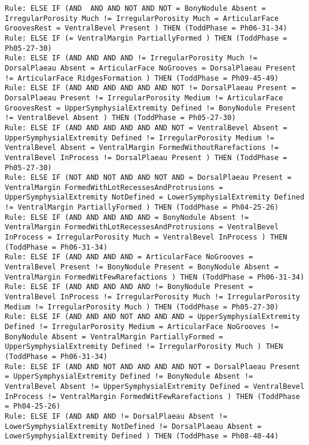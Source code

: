 \begin{lstlisting}
Rule: ELSE IF (AND  AND AND NOT AND NOT = BonyNodule Absent = IrregularPorosity Much != IrregularPorosity Much = ArticularFace GroovesRest = VentralBevel Present ) THEN (ToddPhase = Ph06-31-34)
Rule: ELSE IF (= VentralMargin PartiallyFormed ) THEN (ToddPhase = Ph05-27-30)
Rule: ELSE IF (AND AND AND AND != IrregularPorosity Much != DorsalPlaeau Absent = ArticularFace NoGrooves = DorsalPlaeau Present != ArticularFace RidgesFormation ) THEN (ToddPhase = Ph09-45-49)
Rule: ELSE IF (AND AND AND AND AND AND NOT != DorsalPlaeau Present = DorsalPlaeau Present != IrregularPorosity Medium != ArticularFace GroovesRest = UpperSymphysialExtremity Defined != BonyNodule Present != VentralBevel Absent ) THEN (ToddPhase = Ph05-27-30)
Rule: ELSE IF (AND AND AND AND AND AND NOT = VentralBevel Absent = UpperSymphysialExtremity Defined != IrregularPorosity Medium != VentralBevel Absent = VentralMargin FormedWithoutRarefactions != VentralBevel InProcess != DorsalPlaeau Present ) THEN (ToddPhase = Ph05-27-30)
Rule: ELSE IF (NOT AND NOT AND AND NOT AND = DorsalPlaeau Present = VentralMargin FormedWithLotRecessesAndProtrusions = UpperSymphysialExtremity NotDefined = LowerSymphysialExtremity Defined != VentralMargin PartiallyFormed ) THEN (ToddPhase = Ph04-25-26)
Rule: ELSE IF (AND AND AND AND AND = BonyNodule Absent != VentralMargin FormedWithLotRecessesAndProtrusions = VentralBevel InProcess = IrregularPorosity Much = VentralBevel InProcess ) THEN (ToddPhase = Ph06-31-34)
Rule: ELSE IF (AND AND AND AND = ArticularFace NoGrooves = VentralBevel Present != BonyNodule Present = BonyNodule Absent = VentralMargin FormedWitFewRarefactions ) THEN (ToddPhase = Ph06-31-34)
Rule: ELSE IF (AND AND AND AND AND != BonyNodule Present = VentralBevel InProcess != IrregularPorosity Much != IrregularPorosity Medium != IrregularPorosity Much ) THEN (ToddPhase = Ph05-27-30)
Rule: ELSE IF (AND AND AND NOT AND AND AND = UpperSymphysialExtremity Defined != IrregularPorosity Medium = ArticularFace NoGrooves != BonyNodule Absent = VentralMargin PartiallyFormed = UpperSymphysialExtremity Defined != IrregularPorosity Much ) THEN (ToddPhase = Ph06-31-34)
Rule: ELSE IF (AND AND NOT AND AND AND AND NOT = DorsalPlaeau Present = UpperSymphysialExtremity Defined != BonyNodule Absent != VentralBevel Absent != UpperSymphysialExtremity Defined = VentralBevel InProcess != VentralMargin FormedWitFewRarefactions ) THEN (ToddPhase = Ph04-25-26)
Rule: ELSE IF (AND AND AND != DorsalPlaeau Absent != LowerSymphysialExtremity NotDefined != DorsalPlaeau Absent = LowerSymphysialExtremity Defined ) THEN (ToddPhase = Ph08-40-44)

\end{lstlisting}
